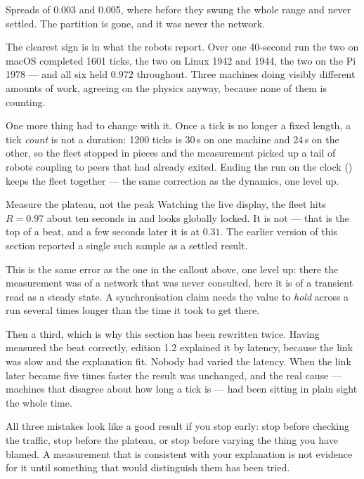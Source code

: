 \noindent Spreads of 0.003 and 0.005, where before they swung the whole range
and never settled. The partition is gone, and it was never the network.

The clearest sign is in what the robots report. Over one 40-second run the two
on macOS completed 1601 ticks, the two on Linux 1942 and 1944, the two on the
Pi 1978 --- and all six held $0.972$ throughout. Three machines doing visibly
different amounts of work, agreeing on the physics anyway, because none of
them is counting.

One more thing had to change with it. Once a tick is no longer a fixed length,
a tick \emph{count} is not a duration: 1200 ticks is 30\,s on one machine and
24\,s on the other, so the fleet stopped in pieces and the measurement picked
up a tail of robots coupling to peers that had already exited. Ending the run
on the clock () keeps the fleet together --- the same
correction as the dynamics, one level up.

\begin{callout}{Measure the plateau, not the peak}
Watching the live display, the fleet hits $R = 0.97$ about ten seconds in and
looks globally locked. It is not --- that is the top of a beat, and a few
seconds later it is at $0.31$. The earlier version of this section reported a
single such sample as a settled result.

This is the same error as the one in the callout above, one level up: there
the measurement was of a network that was never consulted, here it is of a
transient read as a steady state. A synchronisation claim needs the value to
\emph{hold} across a run several times longer than the time it took to get
there.

Then a third, which is why this section has been rewritten twice. Having
measured the beat correctly, edition 1.2 explained it by latency, because the
link was slow and the explanation fit. Nobody had varied the latency. When the
link later became five times faster the result was unchanged, and the real
cause --- machines that disagree about how long a tick is --- had been sitting
in plain sight the whole time.

All three mistakes look like a good result if you stop early: stop before
checking the traffic, stop before the plateau, or stop before varying the thing
you have blamed. A measurement that is consistent with your explanation is not
evidence for it until something that would distinguish them has been tried.
\end{callout}

